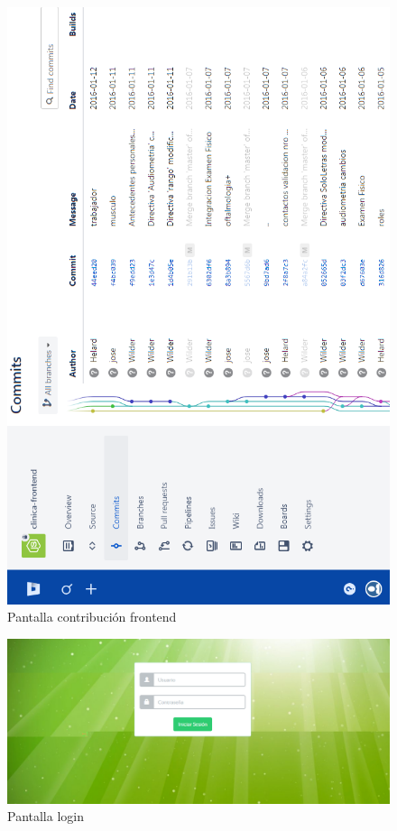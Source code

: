 	\begin{figure}[H]
	    \centering
		\includegraphics[width=13cm]{../imgs/ui/bitbucket-front.png}
		\caption{Pantalla contribución frontend}
		\label{figure:bitbucket-front}
	\end{figure}
	
	\begin{figure}[H]
	    \centering
		\includegraphics[width=18cm]{../imgs/ui/login.png}
		\caption{Pantalla login}
		\label{figure:login}
	\end{figure}
	
